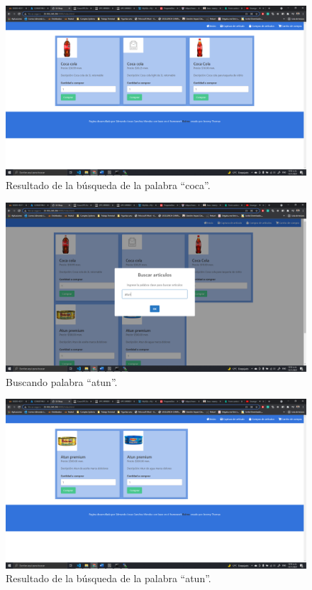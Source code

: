 \documentclass[11pt]{article}
\begin{document}
		\begin{figure}[H]
			\centering
			\includegraphics[scale=0.34]{resources/p2.1.2.png}
			\caption{Resultado de la búsqueda de la palabra ``coca''.}\label{fig:picture}
		\end{figure}
		\begin{figure}[H]
			\centering
			\includegraphics[scale=0.34]{resources/p2.2.1.png}
			\caption{Buscando palabra ``atun''.}\label{fig:picture}
		\end{figure}
		\begin{figure}[H]
			\centering
			\includegraphics[scale=0.34]{resources/p2.2.2.png}
			\caption{Resultado de la búsqueda de la palabra ``atun''.}\label{fig:picture}
		\end{figure}
\end{document}
